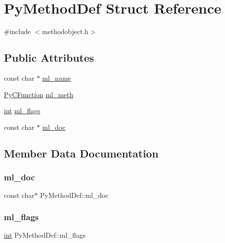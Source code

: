 \hypertarget{struct_py_method_def}{}\section{Py\+Method\+Def Struct Reference}
\label{struct_py_method_def}


{\ttfamily \#include $<$methodobject.\+h$>$}

\subsection*{Public Attributes}
\begin{DoxyCompactItemize}
\item 
const char $\ast$ \mbox{\hyperlink{struct_py_method_def_a308a3fcf53e3b75685ed2ebf11cf77de}{ml\+\_\+name}}
\item 
\mbox{\hyperlink{methodobject_8h_af268178dccdbfeb92ee45524b69d5674}{Py\+C\+Function}} \mbox{\hyperlink{struct_py_method_def_a2e99fd743a714b893d8735951000449e}{ml\+\_\+meth}}
\item 
\mbox{\hyperlink{warnings_8h_a74f207b5aa4ba51c3a2ad59b219a423b}{int}} \mbox{\hyperlink{struct_py_method_def_a05f3ccbdc28b4ddf5a0a63e6c41b0e8c}{ml\+\_\+flags}}
\item 
const char $\ast$ \mbox{\hyperlink{struct_py_method_def_a1959e75fa6c0ad603b1f54ca97a01212}{ml\+\_\+doc}}
\end{DoxyCompactItemize}


\subsection{Member Data Documentation}
\mbox{\label{struct_py_method_def_a1959e75fa6c0ad603b1f54ca97a01212}} 
\subsubsection{\texorpdfstring{ml\_doc}{ml\_doc}}
{\footnotesize\ttfamily const char$\ast$ Py\+Method\+Def\+::ml\+\_\+doc}

\mbox{\label{struct_py_method_def_a05f3ccbdc28b4ddf5a0a63e6c41b0e8c}} 
\subsubsection{\texorpdfstring{ml\_flags}{ml\_flags}}
{\footnotesize\ttfamily \mbox{\hyperlink{warnings_8h_a74f207b5aa4ba51c3a2ad59b219a423b}{int}} Py\+Method\+Def\+::ml\+\_\+flags}

